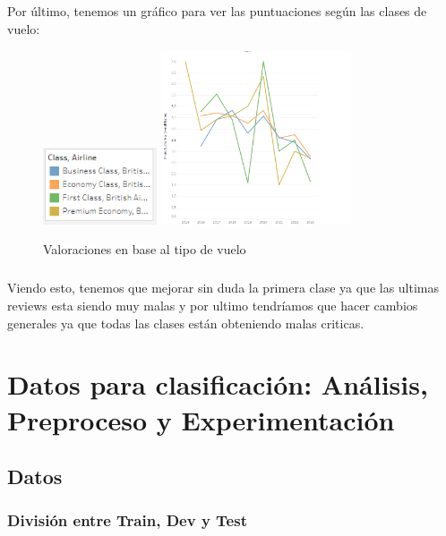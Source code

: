 \documentclass{report}
\begin{document}
            \paragraph*{}{
            Por último, tenemos un gráfico para ver las puntuaciones según las clases de vuelo:
            }
            \begin{figure}[H]
                \centering
                \includegraphics[width=0.3\textwidth]{img/Guion.png}
                \includegraphics[width=0.5\textwidth]{img/Lineas.png}
                \caption{Valoraciones en base al tipo de vuelo}
            \end{figure}

            \paragraph*{}{
            Viendo esto, tenemos que mejorar sin duda la primera clase ya que las ultimas reviews esta siendo muy malas y por ultimo tendríamos que hacer cambios generales ya que todas las clases están obteniendo malas criticas.
            }
    \chapter{Datos para clasificación: Análisis, Preproceso y Experimentación}
        \section{Datos}
            \subsection{División entre Train, Dev y Test}
\end{document}
